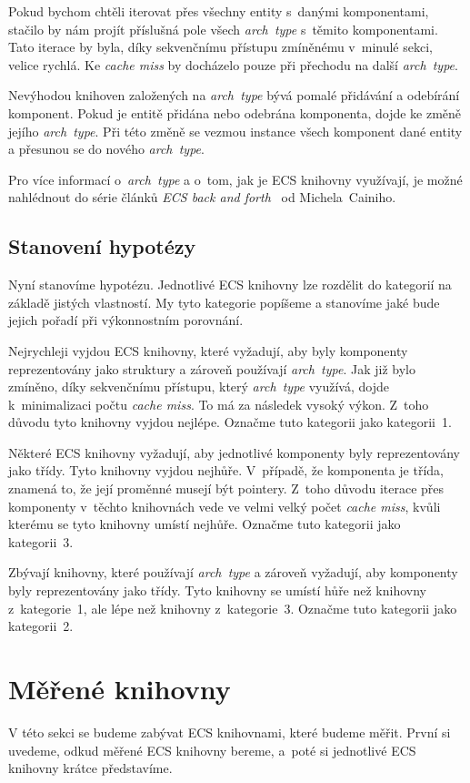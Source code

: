 Pokud bychom chtěli iterovat přes všechny entity s~danými komponentami, stačilo by nám projít příslušná pole všech \textit{arch~type} s~těmito komponentami. Tato iterace by byla, díky sekvenčnímu přístupu zmíněnému v~minulé sekci, velice rychlá. Ke \textit{cache miss} by docházelo pouze při přechodu na další \textit{arch~type}.

Nevýhodou knihoven založených na \textit{arch~type} bývá pomalé přidávání a odebírání komponent. Pokud je entitě přidána nebo odebrána komponenta, dojde ke změně jejího \textit{arch~type}. Při této změně se vezmou instance všech komponent dané entity a přesunou se do nového \textit{arch~type}.

Pro více informací o~\textit{arch~type} a o~tom, jak je ECS knihovny využívají, je možné nahlédnout do série článků \textit{ECS back and forth}~\cite{Caini_2019} od Michela~Cainiho.

\subsection{Stanovení hypotézy}
\label{hypothesis}
Nyní stanovíme hypotézu. Jednotlivé ECS knihovny lze rozdělit do kategorií na základě jistých vlastností. My tyto kategorie popíšeme a stanovíme jaké bude jejich pořadí při výkonnostním porovnání.

Nejrychleji vyjdou ECS knihovny, které vyžadují, aby byly komponenty reprezentovány jako struktury a zároveň používají \textit{arch~type}. Jak již bylo zmíněno, díky sekvenčnímu přístupu, který \textit{arch~type} využívá, dojde k~minimalizaci počtu \textit{cache miss}. To má za následek vysoký výkon. Z~toho důvodu tyto knihovny vyjdou nejlépe. Označme tuto kategorii jako kategorii~1.

Některé ECS knihovny vyžadují, aby jednotlivé komponenty byly reprezentovány jako třídy. Tyto knihovny vyjdou nejhůře. V~případě, že komponenta je třída, znamená to, že její proměnné musejí být pointery. Z~toho důvodu iterace přes komponenty v~těchto knihovnách vede ve velmi velký počet \textit{cache miss}, kvůli kterému se tyto knihovny umístí nejhůře. Označme tuto kategorii jako kategorii~3.

Zbývají knihovny, které používají \textit{arch~type} a zároveň vyžadují, aby komponenty byly reprezentovány jako třídy. Tyto knihovny se umístí hůře než knihovny z~kategorie~1, ale lépe než knihovny z~kategorie~3. Označme tuto kategorii jako kategorii~2.

\section{Měřené knihovny}
V této sekci se budeme zabývat ECS knihovnami, které budeme měřit. První si uvedeme, odkud měřené ECS knihovny bereme, a~poté si jednotlivé ECS knihovny krátce představíme.


